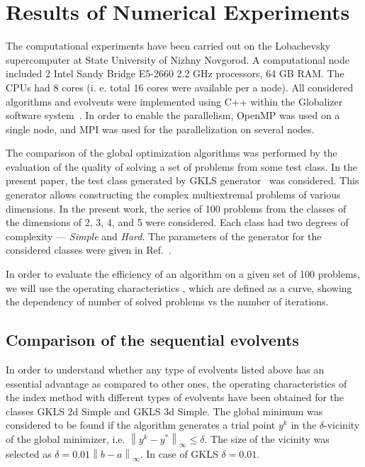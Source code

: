 \documentclass[runningheads]{llncs}
\begin{document}
\section{Results of Numerical Experiments}

The computational experiments have been carried out on the Lobachevsky supercomputer at
State University of Nizhny Novgorod. A computational node included 2 Intel
Sandy Bridge E5-2660 2.2 GHz processors, 64 GB RAM. The CPUs had 8 cores (i. e. total 16
cores were available per a node). All considered algorithms and evolvents were implemented
using C++ within the Globalizer software system~\cite{globalizerSystem}.
In order to enable the parallelism,
OpenMP was used on a single node, and MPI was used for the parallelization on
several nodes.

The comparison of the global optimization algorithms was performed by the evaluation of the
quality of solving a set of problems from some test class.
In the present paper, the test class generated by GKLS generator~\cite{Gaviano2003} was
considered. This generator allows constructing the complex multiextremal problems of various
dimensions. In the present work, the series of 100 problems from the classes of the dimensions
of 2, 3, 4, and 5 were considered.
Each class had two degrees of complexity --- \textit{Simple} and \textit{Hard}. The parameters
of the generator for the considered classes were given in Ref.~\cite{Gaviano2003}.


In order to evaluate the efficiency of an algorithm on a given set of 100 problems, we will use
the operating characteristics \cite{grishaginClass}, which are defined as a
curve, showing the dependency of number of solved problems vs the number of iterations.

\subsection{Comparison of the sequential evolvents}
\label{sec:seq_comp}
In order to understand whether any type of evolvents listed above has an essential advantage as
compared to other ones, the operating characteristics of the index method with different types
of evolvents have been obtained for the classes GKLS 2d Simple and GKLS 3d Simple. The
global minimum was considered to be found if the algorithm generates a trial point $y^k$ in the
$\delta$-vicinity of the global minimizer, i.e. $\left\|y^k-y^\ast\right\|_\infty\leq\delta$. The size
of the vicinity was selected as $\delta = 0.01\left\|b-a\right\|_\infty$. In case of GKLS
$\delta=0.01$.
\end{document}
